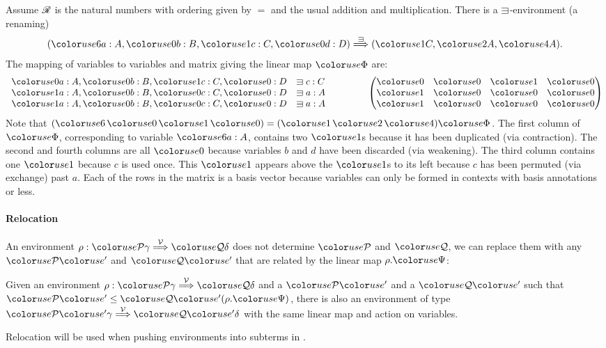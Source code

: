 \begin{example}
  Assume $\mathscr R$ is the natural numbers with ordering given by $=$ and the usual
  addition and multiplication.
  There is a $\sqni$-environment (a renaming)
  \[
    \plr{\gr6a : A, \gr0b : B, \gr1c : C, \gr0d : D} \env\sqni
    \plr{\gr1C, \gr2A, \gr4A}.
  \]
  The mapping of variables to variables and matrix giving the linear
  map $\gr\Phi$ are:
  \begin{displaymath}
    \begin{array}{ll}
    \gr0a : A, \gr0b : B, \gr1c : C, \gr0 : D &\sqni c : C \\
    \gr1a : A, \gr0b : B, \gr0c : C, \gr0 : D &\sqni a : A \\
    \gr1a : A, \gr0b : B, \gr0c : C, \gr0 : D &\sqni a : A
    \end{array}
    \qquad\qquad
    \begin{pmatrix}
      \gr0 & \gr0 & \gr1 & \gr0 \\
      \gr1 & \gr0 & \gr0 & \gr0 \\
      \gr1 & \gr0 & \gr0 & \gr0
    \end{pmatrix}
  \end{displaymath}
  Note that $(\gr 6\,\gr 0\,\gr 1\,\gr 0) = (\gr 1\,\gr 2\,\gr 4)\gr \Phi$.
  The first column of $\gr\Phi$, corresponding to variable $\gr6a : A$, contains two $\gr1$s
  because it has been duplicated (via contraction).
  The second and fourth columns are all $\gr0$ because variables
  $b$ and $d$ have been discarded (via weakening).
  The third column contains one $\gr1$ because $c$ is used once.
  This $\gr1$ appears above the $\gr1$s to its left because $c$ has been
  permuted (via exchange) past $a$.
  Each of the rows in the matrix is a basis vector because variables can only
  be formed in contexts with basis annotations or less.
\end{example}

\paragraph{Relocation} An environment
$\rho : \grP\gamma \env\V \grQ\delta$ does not determine $\grP$ and
$\grQ$, we can replace them with any $\grPprime$ and $\grQprime$ that
are related by the linear map $\rho.\gr\Psi$:

\begin{lemma}\label{thm:env-resize}
  Given an environment $\rho : \grP\gamma \env\V \grQ\delta$ and a $\grPprime$
  and a $\grQprime$ such that $\grPprime \leq \grQprime\plr{\rho.\gr\Psi}$,
  there is also an environment of type $\grPprime\gamma \env\V \grQprime\delta$
  with the same linear map and action on variables.
\end{lemma}
Relocation will be used when pushing environments into subterms in
.

